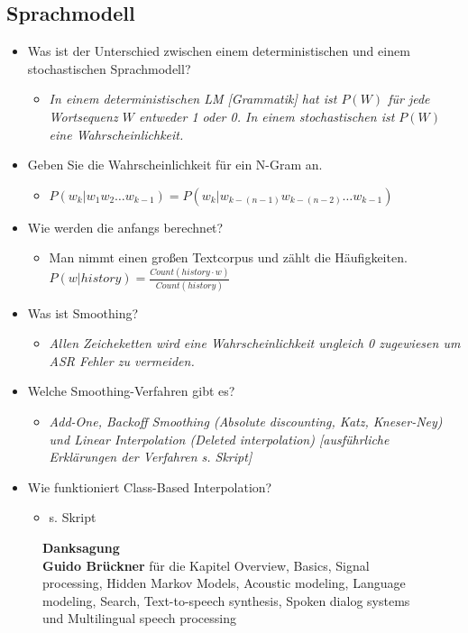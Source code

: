 \subsection{Sprachmodell}
\begin{itemize}
\item Was ist der Unterschied zwischen einem deterministischen und einem stochastischen Sprachmodell?
\begin{itemize}
\item \emph{In einem deterministischen LM [Grammatik] hat ist $P(W)$ für jede Wortsequenz $W$ entweder 1 oder 0. In einem stochastischen ist $P(W)$ eine Wahrscheinlichkeit.}
\end{itemize}
\item Geben Sie die Wahrscheinlichkeit für ein N-Gram an.
\begin{itemize}
\item $P(w_k | w_1w_2\dots w_{k-1}) = P(w_k | w_{k-(n-1)}w_{k-(n-2)}\dots w_{k-1})$
\end{itemize}
\item Wie werden die anfangs berechnet? 
\begin{itemize}
\item Man nimmt einen großen Textcorpus und zählt die Häufigkeiten. $P(w|history) = \frac{Count(history \cdot w)}{Count(history)}$
\end{itemize}
\item Was ist Smoothing?
\begin{itemize}
\item \emph{Allen Zeicheketten wird eine Wahrscheinlichkeit ungleich 0 zugewiesen um ASR Fehler zu vermeiden.}
\end{itemize}
\item Welche Smoothing-Verfahren gibt es?
\begin{itemize}
\item \emph{Add-One, Backoff Smoothing (Absolute discounting, Katz, Kneser-Ney) und Linear Interpolation (Deleted interpolation) [ausführliche Erklärungen der Verfahren s. Skript]}
\end{itemize}
\item Wie funktioniert Class-Based Interpolation? 
\begin{itemize}
\item s. Skript
\end{itemize}
\end{itemize}

\newpage

\begin{figure}
\centering
\textbf{Danksagung} \\
\textbf{Guido Brückner} für die Kapitel Overview, Basics, Signal processing, Hidden Markov Models, Acoustic modeling, Language modeling, Search, Text-to-speech synthesis, Spoken dialog systems und Multilingual speech processing
\end{figure}

